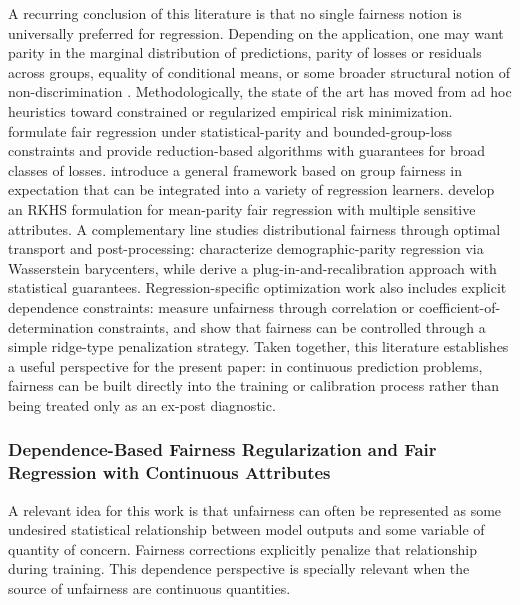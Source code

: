 \documentclass[12pt, draft]{article}
\theoremstyle{plain}
\theoremstyle{definition}
\newcommand{\1}{\mathbf{1}}
\begin{document}
A recurring conclusion of this literature is that no single fairness notion is universally preferred for regression. Depending on the application, one may want parity in the marginal distribution of predictions, parity of losses or residuals across groups, equality of conditional means, or some broader structural notion of non-discrimination \cite{AgarwalDudikWu2019,CatonHaas2024,BarocasHardtNarayanan2023}. Methodologically, the state of the art has moved from ad hoc heuristics toward constrained or regularized empirical risk minimization. \textcite{AgarwalDudikWu2019} formulate fair regression under statistical-parity and bounded-group-loss constraints and provide reduction-based algorithms with guarantees for broad classes of losses. \textcite{FitzsimonsEtAl2019} introduce a general framework based on group fairness in expectation that can be integrated into a variety of regression learners. \textcite{WeiEtAl2023} develop an RKHS formulation for mean-parity fair regression with multiple sensitive attributes. A complementary line studies distributional fairness through optimal transport and post-processing: \textcite{ChzhenEtAl2020Wasserstein} characterize demographic-parity regression via Wasserstein barycenters, while \textcite{ChzhenEtAl2020Recalibration} derive a plug-in-and-recalibration approach with statistical guarantees. Regression-specific optimization work also includes explicit dependence constraints: \textcite{KomiyamaEtAl2018} measure unfairness through correlation or coefficient-of-determination constraints, and \textcite{ScutariPaneroProissl2022} show that fairness can be controlled through a simple ridge-type penalization strategy. Taken together, this literature establishes a useful perspective for the present paper: in continuous prediction problems, fairness can be built directly into the training or calibration process rather than being treated only as an ex-post diagnostic.

\subsubsection{Dependence-Based Fairness Regularization and Fair Regression with Continuous Attributes}

A relevant idea for this work is that unfairness can often be represented as some undesired statistical relationship between model outputs and some variable of quantity of concern. Fairness corrections explicitly penalize that relationship during training. This dependence perspective is specially relevant when the source of unfairness are continuous quantities.
\end{document}
